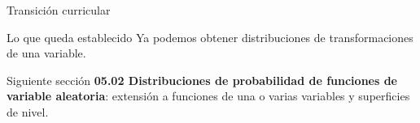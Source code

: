 \documentclass[10pt,aspectratio=169]{beamer}
\begin{document}
\begin{frame}{Transición curricular}
  \footnotesize
  \begin{block}{Lo que queda establecido}
    Ya podemos obtener distribuciones de transformaciones de una variable.
  \end{block}
  \begin{alertblock}{Siguiente sección}
    \textbf{05.02 Distribuciones de probabilidad de funciones de variable
    aleatoria}: extensión a funciones de una o varias variables y superficies
    de nivel.
  \end{alertblock}
\end{frame}
\end{document}
